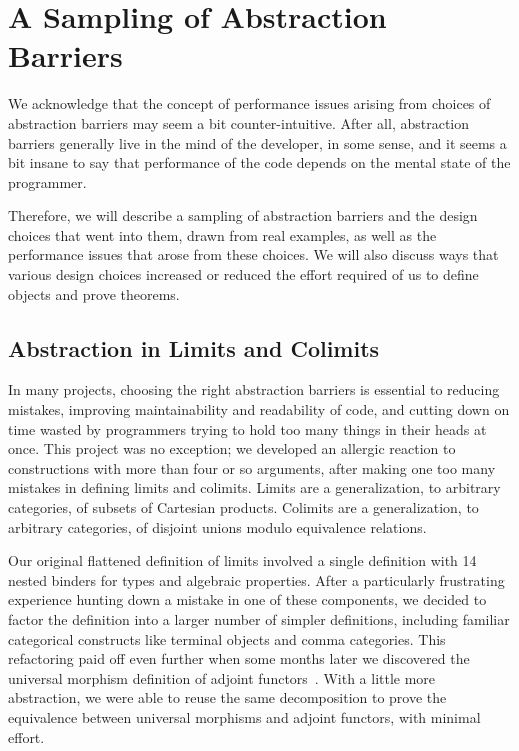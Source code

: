 \section{A Sampling of Abstraction Barriers}\label{sec:abstraction-barriers}

We acknowledge that the concept of performance issues arising from choices of abstraction barriers may seem a bit counter-intuitive.
After all, abstraction barriers generally live in the mind of the developer, in some sense, and it seems a bit insane to say that performance of the code depends on the mental state of the programmer.

Therefore, we will describe a sampling of abstraction barriers and the design choices that went into them, drawn from real examples, as well as the performance issues that arose from these choices.
We will also discuss ways that various design choices increased or reduced the effort required of us to define objects and prove theorems.


\subsection{Abstraction in Limits and Colimits}\label{sec:abstraction:(co)limits}

In many projects, choosing the right abstraction barriers is essential to reducing mistakes, improving maintainability and readability of code, and cutting down on time wasted by programmers trying to hold too many things in their heads at once.
This project was no exception; we developed an allergic reaction to constructions with more than four or so arguments, after making one too many mistakes in defining limits and colimits.
Limits are a generalization, to arbitrary categories, of subsets of Cartesian products.
Colimits are a generalization, to arbitrary categories, of disjoint unions modulo equivalence relations.

Our original flattened definition of limits involved a single definition with 14 nested binders for types and algebraic properties.
After a particularly frustrating experience hunting down a mistake in one of these components, we decided to factor the definition into a larger number of simpler definitions, including familiar categorical constructs like terminal objects and comma categories.
This refactoring paid off even further when some months later we discovered the universal morphism definition of adjoint functors~\cite{wiki:adjoint-functors:universal-morphisms,ncatlab:adjoint+functor:UniversalArrows}.
With a little more abstraction, we were able to reuse the same decomposition to prove the equivalence between universal morphisms and adjoint functors, with minimal effort.

